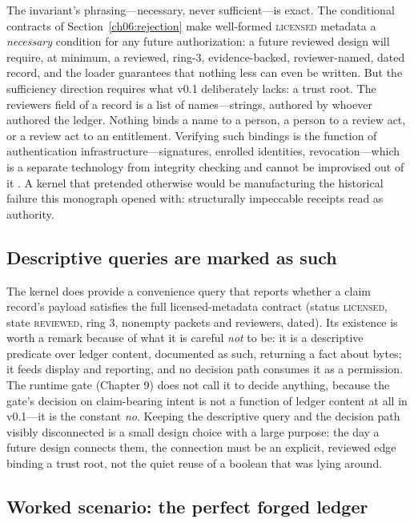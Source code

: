 The invariant's phrasing---necessary, never sufficient---is exact. The
conditional contracts of Section~\ref{ch06:rejection} make well-formed
\textsc{licensed} metadata a \emph{necessary} condition for any future
authorization: a future reviewed design will require, at minimum, a
reviewed, ring-3, evidence-backed, reviewer-named, dated record, and the
loader guarantees that nothing less can even be written. But the
sufficiency direction requires what v0.1 deliberately lacks: a trust
root. The reviewers field of a record is a list of names---strings,
authored by whoever authored the ledger. Nothing binds a name to a
person, a person to a review act, or a review act to an entitlement.
Verifying such bindings is the function of authentication
infrastructure---signatures, enrolled identities, revocation---which is
a separate technology from integrity checking and cannot be improvised
out of it \cite{anderson}. A kernel that pretended otherwise would be
manufacturing the historical failure this monograph opened with:
structurally impeccable receipts read as authority.

\subsection{Descriptive queries are marked as such}

The kernel does provide a convenience query that reports whether a claim
record's payload satisfies the full licensed-metadata contract
(status \textsc{licensed}, state \textsc{reviewed}, ring 3, nonempty
packets and reviewers, dated). Its existence is worth a remark because
of what it is careful \emph{not} to be: it is a descriptive predicate
over ledger content, documented as such, returning a fact about bytes;
it feeds display and reporting, and no decision path consumes it as a
permission. The runtime gate (Chapter 9) does not call it to decide
anything, because the gate's decision on claim-bearing intent is not a
function of ledger content at all in v0.1---it is the constant
\emph{no}. Keeping the descriptive query and the decision path visibly
disconnected is a small design choice with a large purpose: the day a
future design connects them, the connection must be an explicit,
reviewed edge binding a trust root, not the quiet reuse of a boolean
that was lying around.

\subsection{Worked scenario: the perfect forged ledger}

